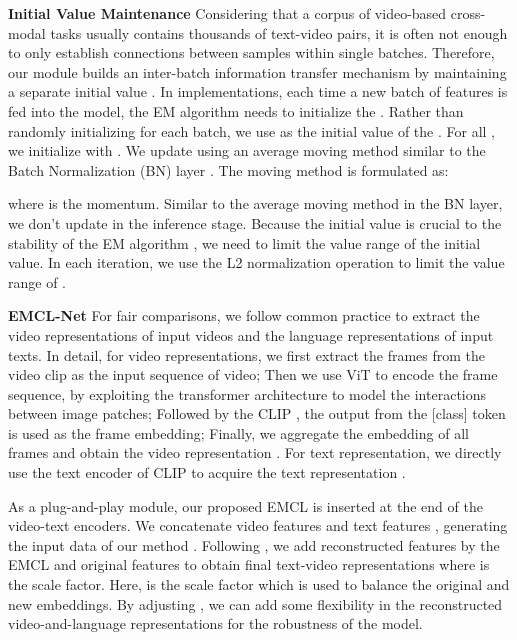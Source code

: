 \documentclass{article}
\newcommand{\myparagraph}[1]{\textbf{#1}\hspace{1.8ex}}
\begin{document}
\myparagraph{Initial Value Maintenance}
Considering that a corpus of video-based cross-modal tasks usually contains thousands of text-video pairs, it is often not enough to only establish connections between samples within single batches. Therefore, our module builds an inter-batch information transfer mechanism by maintaining a separate initial value .
In implementations, each time a new batch of features is fed into the model, the EM algorithm needs to initialize the . Rather than randomly initializing  for each batch, we use  as the initial value of the . For all , we initialize  with . We update  using an average moving method similar to the Batch Normalization (BN) layer \cite{ioffe2015batch}. The moving method is formulated as:

where  is the momentum. Similar to the average moving method in the BN layer, we don't update  in the inference stage. Because the initial value is crucial to the stability of the EM algorithm \cite{abdolali2021beyond,li2019expectation}, we need to limit the value range of the initial value. In each iteration, we use the L2 normalization operation to limit the value range of .

\myparagraph{EMCL-Net}
For fair comparisons, we follow common practice \cite{luo2021clip4clip,cheng2021improving,wang2022disentangled} to extract the video representations of input videos and the language representations of input texts. In detail, for video representations, we first extract the frames from the video clip as the input sequence of video; Then we use ViT \cite{dosovitskiy2021an} to encode the frame sequence, by exploiting the transformer architecture to model the interactions between image patches; Followed by the CLIP \cite{radford2021learning}, the output from the [class] token is used as the frame embedding; Finally, we aggregate the embedding of all frames and obtain the video representation . For text representation, we directly use the text encoder of CLIP to acquire the text representation .

As a plug-and-play module, our proposed EMCL is inserted at the end of the video-text encoders. 
We concatenate video features  and text features , generating the input data of our method . Following \cite{chun2021probabilistic}, we add reconstructed features  by the EMCL and original features  to obtain final text-video representations  
where  is the scale factor. 
Here,  is the scale factor which is used to balance the original and new embeddings. By adjusting , we can add some flexibility in the reconstructed video-and-language representations for the robustness of the model.
\end{document}
